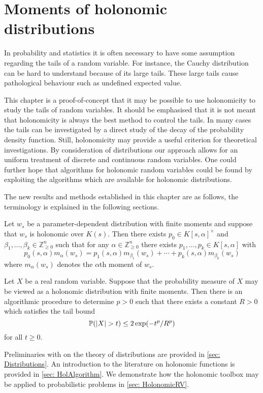 \chapter{Moments of holonomic distributions}
In probability and statistics it is often necessary to have some assumption regarding the tails of a random variable.
For instance, the Cauchy distribution can be hard to understand because of its large tails.
These large tails cause pathological behaviour such as undefined expected value.

This chapter is a proof-of-concept that it may be possible to use holonomicity to study the tails of random variables.
It should be emphasised that it is not meant that holonomicity is always the best method to control the tails.
In many cases the tails can be investigated by a direct study of the decay of the probability density function.
Still, holonomicity may provide a useful criterion for theoretical investigations.
By consideration of distributions our approach allows for an uniform treatment of discrete and continuous random variables.
One could further hope that algorithms for holonomic random variables could be found by exploiting the algorithms which are available for holonomic distributions.

The new results and methods established in this chapter are as follows, the terminology is explained in the following sections. 
\begin{result}
  Let $w_s$ be a parameter-dependent distribution with finite moments and suppose that $w_s$ is holonomic over $K(s)$.
  Then there exists $p_0\in K[s,\alpha]^\times$ and $\beta_1,\ldots,\beta_k\in \mathbb{Z}_{\geq 0}^n$ such that for any $\alpha \in \mathbb{Z}_{\geq 0}^n$ there exists $p_1,\ldots,p_k \in K[s,\alpha]$ with
  $$p_0(s,\alpha) m_{\alpha}(w_s) = p_1(s,\alpha) m_{\beta_1}(w_s)+ \cdots + p_k(s,\alpha) m_{\beta_k}(w_s)$$
  where $m_\alpha(w_s)$ denotes the $\alpha$th moment of $w_s$.
\end{result}
\begin{result}
    Let $X$ be a real random variable. Suppose that the probability measure of $X$ may be viewed as a holonomic distribution with finite moments. Then there is an algorithmic procedure to determine $p>0$ such that there exists a constant $R>0$ which satisfies the tail bound 
    $$\mathbb{P}(\vert X \vert>t) \leq 2\exp(-t^p/R^p)$$
    for all $t\geq 0$. 
\end{result}
Preliminaries with on the theory of distributions are provided in \cref{sec: Distributions}.
An introduction to the literature on holonomic functions is provided in \cref{sec: HolAlgorithm}.
We demonstrate how the holonomic toolbox may be applied to probabilistic problems in \cref{sec: HolonomicRV}.
